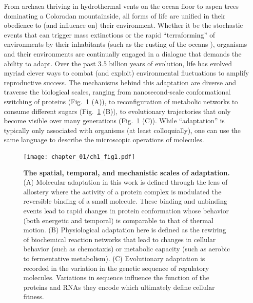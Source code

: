 \documentclass[12pt]{caltech_thesis}
\begin{document}
From archaea thriving in hydrothermal vents on the ocean floor to aspen
trees dominating a Coloradan mountainside, all forms of life are unified
in their obedience to (and influence on) their environment. Whether it
be the stochastic events that can trigger mass extinctions
\autocite{jablonski2001} or the rapid ``terraforming'' of environments
by their inhabitants (such as the rusting of the oceans
\autocite{luo2018}), organisms and their environments are continually
engaged in a dialogue that demands the ability to adapt. Over the past
3.5 billion years of evolution, life has evolved myriad clever ways to
combat (and exploit) environmental fluctuations to amplify reproductive
success. The mechanisms behind this adaptation are diverse and traverse
the biological scales, ranging from nanosecond-scale conformational
switching of proteins (Fig.~\ref{fig:adaptation_levels} (A)), to
reconfiguration of metabolic networks to consume different sugars
(Fig.~\ref{fig:adaptation_levels} (B)), to evolutionary trajectories
that only become visible over many generations
(Fig.~\ref{fig:adaptation_levels} (C)). While ``adaptation'' is
typically only associated with organisms (at least colloquially), one
can use the same language to describe the microscopic operations of
molecules.

\hypertarget{fig:adaptation_levels}{%
\begin{figure}
\centering
\texttt{[image: chapter\_01/ch1\_fig1.pdf]}
\caption[{The spatial, temporal, and mechanistic scales of
adaptation.}]{\textbf{The spatial, temporal, and mechanistic scales of
adaptation.} (A) Molecular adaptation in this work is defined through
the lens of allostery where the activity of a protein complex is
modulated the reversible binding of a small molecule. These binding and
unbinding events lead to rapid changes in protein conformation whose
behavior (both energetic and temporal) is comparable to that of thermal
motion. (B) Physiological adaptation here is defined as the rewiring of
biochemical reaction networks that lead to changes in cellular behavior
(such as chemotaxis) or metabolic capacity (such as aerobic to
fermentative metabolism). (C) Evolutionary adaptation is recorded in the
variation in the genetic sequence of regulatory molecules. Variations in
sequence influence the function of the proteins and RNAs they encode
which ultimately define cellular fitness.}
\label{fig:adaptation_levels}
\end{figure}
}
\end{document}
